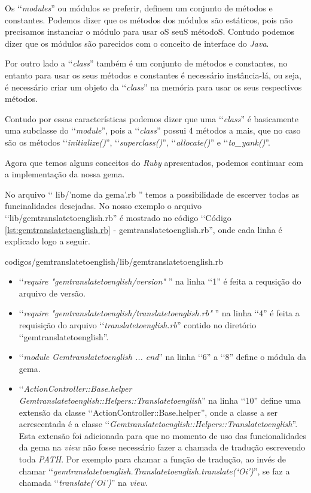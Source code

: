 Os ‘‘\emph{modules}'' ou módulos se preferir, definem um conjunto de métodos e constantes. Podemos 
dizer que os métodos dos módulos são estáticos, pois não precisamos instanciar o módulo para usar oS 
seuS métodoS. Contudo podemos dizer que os módulos são parecidos com o conceito de interface do 
\emph{Java}. 

Por outro lado a ‘‘\emph{class}'' também é um conjunto de métodos e constantes, no 
entanto para usar os seus métodos e constantes é necessário instância-lá, ou seja, é necessário criar 
um objeto da ‘‘\emph{class}'' na memória para usar os seus respectivos métodos. 

Contudo por essas características podemos dizer que uma ‘‘\emph{class}'' é basicamente 
uma subclasse do ‘‘\emph{module}'', pois a ‘‘\emph{class}'' possui 4 métodos a mais, que no caso são 
os métodos ‘‘\emph{initialize()}'', ‘‘\emph{superclass()}'', ‘‘\emph{allocate()}'' e ‘‘\emph{to\_yank()}''.

Agora que temos alguns conceitos do \emph{Ruby} apresentados, podemos continuar com a implementação 
da nossa gema. 

No arquivo ‘‘ lib/'nome da gema'.rb '' temos a possibilidade de escerver todas as 
funcinalidades desejadas. No nosso exemplo o arquivo ‘‘lib/gemtranslatetoenglish.rb'' é mostrado no código 
‘‘Código \ref{lst:gemtranslatetoenglish.rb} - gemtranslatetoenglish.rb'', onde cada linha é explicado 
logo a seguir.


{codigos/gemtranslatetoenglish/lib/gemtranslatetoenglish.rb}

\begin{itemize}

 \item ‘‘\emph{require "gemtranslatetoenglish/version"} '' na linha ‘‘1'' é feita a requsição do arquivo de
 versão.
 
 \item ‘‘\emph{require "gemtranslatetoenglish/translatetoenglish.rb"} '' na linha ‘‘4'' é feita a requisição
 do arquivo ‘‘\emph{translatetoenglish.rb}'' contido no diretório ‘‘gemtranslatetoenglish''.
 
 \item ‘‘\emph{module Gemtranslatetoenglish ... end}'' na linha ‘‘6'' a ‘‘8'' define o módula da gema.
 
 \item ‘‘\emph{ActionController::Base.helper Gemtranslatetoenglish::Helpers::Translatetoenglish}'' na linha 
 ‘‘10'' define uma extensão da classe ‘‘ActionController::Base.helper'', onde a classe a ser acrescentada é
 a classe ‘‘\emph{Gemtranslatetoenglish::Helpers::Translatetoenglish}''. Esta extensão foi adicionada
 para que no momento de uso das funcionalidades da gema na \emph{view} não fosse necessário fazer a chamada 
 de tradução  escrevendo toda \emph{PATH}. Por exemplo para chamar a função de tradução, ao invés
 de chamar ‘‘\emph{gemtranslatetoenglish.Translatetoenglish.translate(‘Oi’)}'', se faz a chamada 
 ‘‘\emph{translate(‘Oi’)}'' na \emph{view}.
 
\end{itemize}

